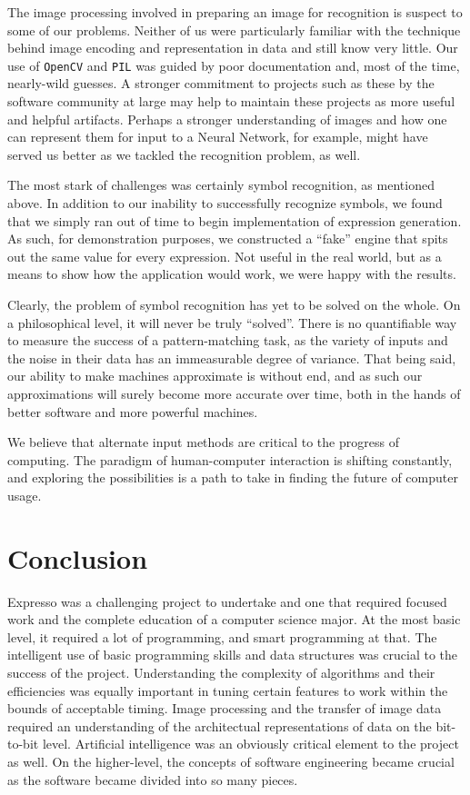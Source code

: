 \documentclass{acm_proc_article-sp}
\begin{document}
The image processing involved in preparing an image for recognition is suspect to some of our problems. Neither of us were particularly familiar with the technique behind image encoding and representation in data and still know very little. Our use of \texttt{OpenCV} and \texttt{PIL} was guided by poor documentation and, most of the time, nearly-wild guesses. A stronger commitment to projects such as these by the software community at large may help to maintain these projects as more useful and helpful artifacts. Perhaps a stronger understanding of images and how one can represent them for input to a Neural Network, for example, might have served us better as we tackled the recognition problem, as well.

The most stark of challenges was certainly symbol recognition, as mentioned above. In addition to our inability to successfully recognize symbols, we found that we simply ran out of time to begin implementation of expression generation. As such, for demonstration purposes, we constructed a ``fake'' engine that spits out the same value for every expression. Not useful in the real world, but as a means to show how the application would work, we were happy with the results.

Clearly, the problem of symbol recognition has yet to be solved on the whole. On a philosophical level, it will never be truly ``solved''. There is no quantifiable way to measure the success of a pattern-matching task, as the variety of inputs and the noise in their data has an immeasurable degree of variance. That being said, our ability to make machines approximate is without end, and as such our approximations will surely become more accurate over time, both in the hands of better software and more powerful machines.

We believe that alternate input methods are critical to the progress of computing. The paradigm of human-computer interaction is shifting constantly, and exploring the possibilities is a path to take in finding the future of computer usage.

\section{Conclusion}
Expresso was a challenging project to undertake and one that required focused work and the complete education of a computer science major. At the most basic level, it required a lot of programming, and smart programming at that. The intelligent use of basic programming skills and data structures was crucial to the success of the project. Understanding the complexity of algorithms and their efficiencies was equally important in tuning certain features to work within the bounds of acceptable timing. Image processing and the transfer of image data required an understanding of the architectual representations of data on the bit-to-bit level. Artificial intelligence was an obviously critical element to the project as well. On the higher-level, the concepts of software engineering became crucial as the software became divided into so many pieces. 
\end{document}

